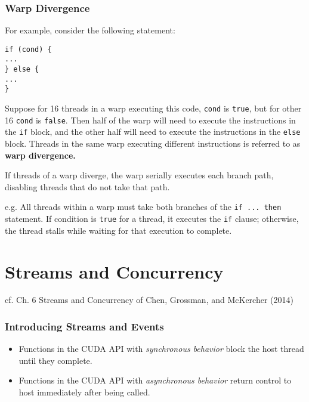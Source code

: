 \documentclass[10pt]{amsart}
\begin{document}
\begin{multicols*}{2}
\subsubsection{Warp Divergence }
For example, consider the following statement:  
\begin{lstlisting}  
if (cond) {
...   
} else {
...
}
\end{lstlisting}

Suppose for 16 threads in a warp executing this code, \verb|cond| is \verb|true|, but for other 16 \verb|cond| is \verb|false|.  Then half of the warp will need to execute the instructions in the \verb|if| block, and the other half will need to execute the instructions in the \verb|else| block.  Threads in the same warp executing different instructions is referred to as \textbf{warp divergence.} 

If threads of a warp diverge, the warp serially executes each branch path, disabling threads that do not take that path.  

e.g. All threads within a warp must take both branches of the \verb|if ... then| statement.  If condition is \verb|true| for a thread, it executes the \verb|if| clause; otherwise, the thread stalls while waiting for that execution to complete.  




\section{Streams and Concurrency}  
cf. Ch. 6 Streams and Concurrency of  Chen, Grossman, and McKercher (2014) \cite{CGM2014}
\subsubsection{Introducing Streams and Events}
\begin{itemize}
	\item Functions in the CUDA API with \emph{synchronous behavior} block the host thread until they complete.  
	\item Functions in the CUDA API with \emph{asynchronous behavior} return control to host immediately after being called.  
\end{itemize}  

\end{multicols*}
\end{document}
